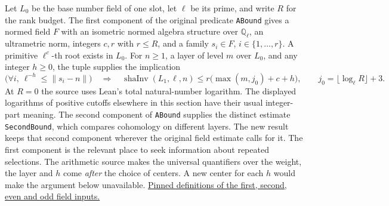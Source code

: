 \documentclass[12pt,letterpaper]{article}
\begin{document}
Let $L_0$ be the base number field of one slot, let $\ell$ be its prime, and write $R$ for the rank budget. The first component of the original predicate \texttt{ABound} gives a normed field $F$ with an isometric normed algebra structure over $\mathbb Q_\ell$, an ultrametric norm, integers $c,r$ with $r\le R$, and a family $s_i\in F$, $i\in\{1,\ldots,r\}$. A primitive $\ell^c$-th root exists in $L_0$. For $n\ge1$, a layer of level $m$ over $L_0$, and any integer $h\ge0$, the tuple supplies the implication
\[
 \bigl(\forall i,\ \ell^{-h}\le\|s_i-n\|\bigr)
 \quad\Longrightarrow\quad
 \operatorname{shaInv}(L_1,\ell,n)
 \le r\bigl(\max(m,j_0)+c+h\bigr),
 \qquad j_0=\lfloor\log_\ell R\rfloor+3.
\]
At $R=0$ the source uses Lean's total natural-number logarithm. The displayed logarithms of positive cutoffs elsewhere in this section have their usual integer-part meaning. The second component of \texttt{ABound} supplies the distinct estimate \texttt{SecondBound}, which compares cohomology on different layers. The new result keeps that second component wherever the original field estimate calls for it. The first component is the relevant place to seek information about repeated selections. The arithmetic source makes the universal quantifiers over the weight, the layer and $h$ come \emph{after} the choice of centers. A new center for each $h$ would make the argument below unavailable. \href{https://github.com/nousentllc/riemann-hypothesis/blob/40e56bab026552e089d7afcfeff08d2defb9c005/src/Development/AutomorphicArithmetic/AutomorphicVarieties/LayeredIsomorphisms/SecondBound.lean#L11-L44}{Pinned definitions of the first, second, even and odd field inputs.}
\end{document}
